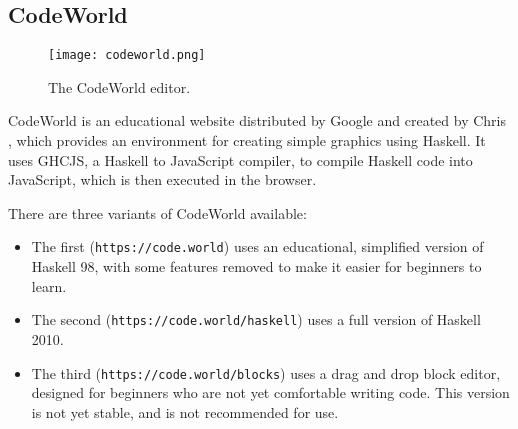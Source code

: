 \documentclass[../main.tex]{subfiles}
\begin{document}
        \subsection{CodeWorld}
            \begin{figure}[H]
                \centering
                \texttt{[image: codeworld.png]}
                    \caption{The CodeWorld editor.}
                    \label{fig:codeworld}
            \end{figure}

            CodeWorld is an educational website distributed by Google and created by Chris
                \citet{codeWorldGitHub}, which provides an environment for creating simple
                graphics using Haskell.
            It uses GHCJS, a Haskell to JavaScript compiler, to compile Haskell code into
                JavaScript, which is then executed in the browser.

            There are three variants of CodeWorld available:
            \begin{itemize}
                \item The first (\texttt{https://code.world}) uses an educational, simplified
                      version of Haskell 98, with some features removed to make it easier for
                      beginners to learn.
                \item The second (\texttt{https://code.world/haskell}) uses a full version of
                      Haskell 2010.
                \item The third (\texttt{https://code.world/blocks}) uses a drag and drop block
                      editor, designed for beginners who are not yet comfortable writing code.
                      This version is not yet stable, and is not recommended for use.
            \end{itemize}
\end{document}
